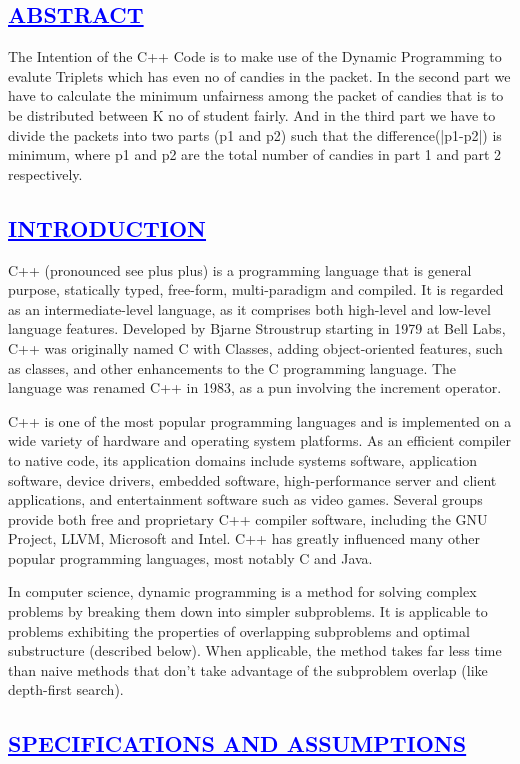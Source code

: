 \documentclass[a4paper,12pt]{report}
\begin{document}
\begin{center}
\chapter{\textcolor{blue}{\underline {ABSTRACT}}}
\end{center}
\noindent The Intention of the C++ Code is to make use of the Dynamic Programming to evalute Triplets which has even no of 
candies in the packet. In the second part we have to calculate the minimum unfairness among the packet of candies that is
to be distributed between K no of student fairly. And in the third part we have to divide the packets into two parts (p1 and p2) such that
the difference(|p1-p2|) is minimum, where p1 and p2 are the total number of candies in
part 1 and part 2 respectively.
\begin{center}
\chapter{\textcolor{blue}{\underline {INTRODUCTION}}}
\end{center}
\noindent C++ (pronounced see plus plus) is a programming language that is general purpose, statically typed, free-form, multi-paradigm and compiled. It is regarded as an intermediate-level language, as it comprises both high-level and low-level language features. Developed by Bjarne Stroustrup starting in 1979 at Bell Labs, C++ was originally named C with Classes, adding object-oriented features, such as classes, and other enhancements to the C programming language. The language was renamed C++ in 1983, as a pun involving the increment operator.

C++ is one of the most popular programming languages and is implemented on a wide variety of hardware and operating system platforms. As an efficient compiler to native code, its application domains include systems software, application software, device drivers, embedded software, high-performance server and client applications, and entertainment software such as video games. Several groups provide both free and proprietary C++ compiler software, including the GNU Project, LLVM, Microsoft and Intel. C++ has greatly influenced many other popular programming languages, most notably C and Java.

In computer science, dynamic programming is a method for solving complex problems by breaking them down into simpler subproblems. It is applicable to problems exhibiting the properties of overlapping subproblems and optimal substructure (described below). When applicable, the method takes far less time than naive methods that don't take advantage of the subproblem overlap (like depth-first search).
\begin{center}
\chapter{\textcolor{blue}{\underline {SPECIFICATIONS AND ASSUMPTIONS}}}
\end{center}
\end{document}
